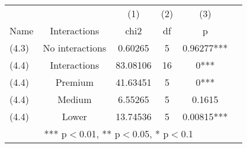 \begin{tabular}{lccccc} \hline
	&& (1) & (2) & (3)\\
	Name&Interactions&chi2&df&p&\\
	(4.3)&No interactions&0.60265&5&0.96277***\\
	(4.4)&Interactions&83.08106&16&0***\\
	(4.4)&Premium&41.63451&5&0***\\
	(4.4)&Medium&6.55265&5&0.1615\\
	(4.4)&Lower&13.74536&5&0.00815***\\
	\hline
	\multicolumn{5}{c}{ *** p$<$0.01, ** p$<$0.05, * p$<$0.1} \\
\end{tabular}
